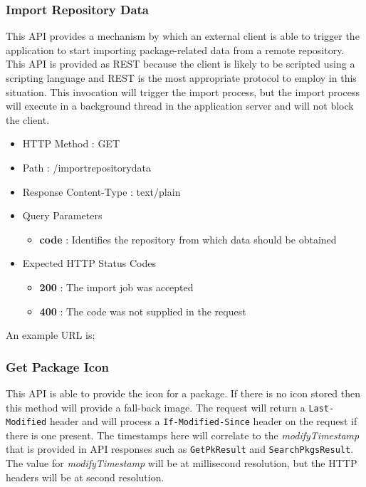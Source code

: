 \subsubsection{Import Repository Data}
\label{api-importrepositorydata}

This API provides a mechanism by which an external client is able to trigger the application to start importing package-related data from a remote repository.  This API is provided as REST because the client is likely to be scripted using a scripting language and REST is the most appropriate protocol to employ in this situation.  This invocation will trigger the import process, but the import process will execute in a background thread in the application server and will not block the client.

\begin{itemize}
\item HTTP Method : GET
\item Path : /importrepositorydata
\item Response Content-Type : text/plain
\item Query Parameters
  \begin{itemize}
  \item {\bf code} : Identifies the repository from which data should be obtained
  \end{itemize}
\item Expected HTTP Status Codes
  \begin{itemize}
  \item {\bf 200} : The import job was accepted
  \item {\bf 400} : The code was not supplied in the request
  \end{itemize}
\end{itemize}

An example URL is;


\subsubsection{Get Package Icon}

This API is able to provide the icon for a package.  If there is no icon stored then this method will provide a fall-back image.  The request will return a {\tt Last-Modified} header and will process a {\tt If-Modified-Since} header on the request if there is one present.  The timestamps here will correlate to the {\it modifyTimestamp} that is provided in API responses such as {\tt GetPkResult} and {\tt SearchPkgsResult}.  The value for {\it modifyTimestamp} will be at millisecond resolution, but the HTTP headers will be at second resolution.

